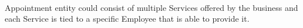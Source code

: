 \documentclass{article}
\begin{document}
    \paragraph{}Appointment entity could consist of multiple Services offered by the business and each Service is tied to a specific Employee that is able to provide it.
    
%
%
%
\end{document}
